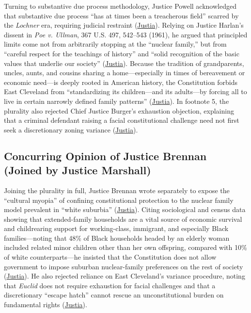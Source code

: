 \documentclass[12pt]{article}
\begin{document}
Turning to substantive due process methodology, Justice Powell acknowledged that substantive due process ``has at times been a treacherous field'' scarred by the \textit{Lochner} era, requiring judicial restraint (\href{https://supreme.justia.com/cases/federal/us/431/494/}{Justia}). Relying on Justice Harlan's dissent in \textit{Poe v. Ullman}, 367 U.S. 497, 542--543 (1961), he argued that principled limits come not from arbitrarily stopping at the ``nuclear family,'' but from ``careful respect for the teachings of history'' and ``solid recognition of the basic values that underlie our society'' (\href{https://supreme.justia.com/cases/federal/us/431/494/}{Justia}). Because the tradition of grandparents, uncles, aunts, and cousins sharing a home---especially in times of bereavement or economic need---is deeply rooted in American history, the Constitution forbids East Cleveland from ``standardizing its children---and its adults---by forcing all to live in certain narrowly defined family patterns'' (\href{https://supreme.justia.com/cases/federal/us/431/494/}{Justia}). In footnote 5, the plurality also rejected Chief Justice Burger's exhaustion objection, explaining that a criminal defendant raising a facial constitutional challenge need not first seek a discretionary zoning variance (\href{https://supreme.justia.com/cases/federal/us/431/494/}{Justia}).

\subsection{Concurring Opinion of Justice Brennan (Joined by Justice Marshall)}
Joining the plurality in full, Justice Brennan wrote separately to expose the ``cultural myopia'' of confining constitutional protection to the nuclear family model prevalent in ``white suburbia'' (\href{https://supreme.justia.com/cases/federal/us/431/494/}{Justia}). Citing sociological and census data showing that extended-family households are a vital source of economic survival and childrearing support for working-class, immigrant, and especially Black families---noting that 48\% of Black households headed by an elderly woman included related minor children other than her own offspring, compared with 10\% of white counterparts---he insisted that the Constitution does not allow government to impose suburban nuclear-family preferences on the rest of society (\href{https://supreme.justia.com/cases/federal/us/431/494/}{Justia}). He also rejected reliance on East Cleveland's variance procedure, noting that \textit{Euclid} does not require exhaustion for facial challenges and that a discretionary ``escape hatch'' cannot rescue an unconstitutional burden on fundamental rights (\href{https://supreme.justia.com/cases/federal/us/431/494/}{Justia}).
\end{document}
